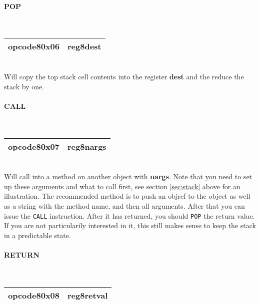 \documentclass[12pt,a4paper]{article}
\begin{document}
\vspace{2em}\begin{minipage}{\textwidth}
\paragraph{POP}
~\vspace{1em}\\\begin{tabular}{|p{2cm}|p{2cm}|}
\hline
opcode8\newline\textbf{0x06} & reg8\newline\textbf{dest} \\
\hline
\end{tabular}\vspace{1em}\\
Will copy the top stack cell contents into the register \textbf{dest} and the reduce the stack by one.
\end{minipage}

\vspace{2em}\begin{minipage}{\textwidth}
\paragraph{CALL}
~\vspace{1em}\\\begin{tabular}{|p{2cm}|p{2cm}|}
\hline
opcode8\newline\textbf{0x07} & reg8\newline\textbf{nargs} \\
\hline
\end{tabular}\vspace{1em}\\
Will call into a method on another object with \textbf{nargs}. Note that you need to set up these arguments and what to call first, see section \ref{sec:stack} above for an illustration. The recommended method is to push an objref  to the object as well as a string with the method name, and then all arguments. After that you can issue the \verb|CALL| instruction. After it has  returned, you should \verb|POP| the return value. If you are not particularily interested in it, this still makes sense to keep the stack in a predictable state.
\end{minipage}

\vspace{2em}\begin{minipage}{\textwidth}
\paragraph{RETURN}
~\vspace{1em}\\\begin{tabular}{|p{2cm}|p{2cm}|}
\hline
opcode8\newline\textbf{0x08} & reg8\newline\textbf{retval} \\
\hline
\end{tabular}\vspace{1em}\\
\end{minipage}
\end{document}
